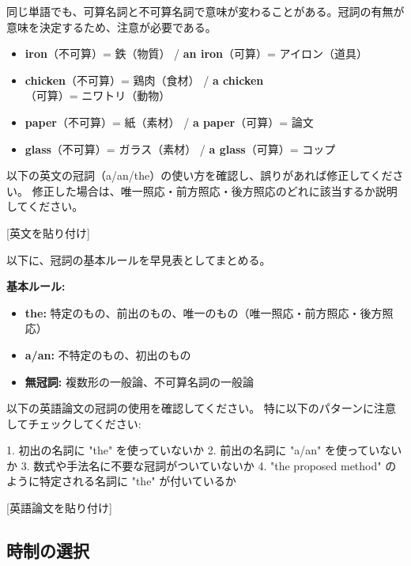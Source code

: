 同じ単語でも、可算名詞と不可算名詞で意味が変わることがある。冠詞の有無が意味を決定するため、注意が必要である。

\begin{itemize}
\item \textbf{iron}（不可算）= 鉄（物質） / \textbf{an iron}（可算）= アイロン（道具）
\item \textbf{chicken}（不可算）= 鶏肉（食材） / \textbf{a chicken}（可算）= ニワトリ（動物）
\item \textbf{paper}（不可算）= 紙（素材） / \textbf{a paper}（可算）= 論文
\item \textbf{glass}（不可算）= ガラス（素材） / \textbf{a glass}（可算）= コップ
\end{itemize}

\begin{promptbox}
以下の英文の冠詞（a/an/the）の使い方を確認し、誤りがあれば修正してください。
修正した場合は、唯一照応・前方照応・後方照応のどれに該当するか説明してください。

{[}英文を貼り付け]
\end{promptbox}

以下に、冠詞の基本ルールを早見表としてまとめる。

\textbf{基本ルール:}
\begin{itemize}
\item \textbf{the:} 特定のもの、前出のもの、唯一のもの（唯一照応・前方照応・後方照応）
\item \textbf{a/an:} 不特定のもの、初出のもの
\item \textbf{無冠詞:} 複数形の一般論、不可算名詞の一般論
\end{itemize}

\begin{promptbox}
以下の英語論文の冠詞の使用を確認してください。
特に以下のパターンに注意してチェックしてください:

1. 初出の名詞に "the" を使っていないか
2. 前出の名詞に "a/an" を使っていないか
3. 数式や手法名に不要な冠詞がついていないか
4. "the proposed method" のように特定される名詞に
   "the" が付いているか

{[}英語論文を貼り付け]
\end{promptbox}

\subsection{時制の選択}
\label{subsec:tense}

